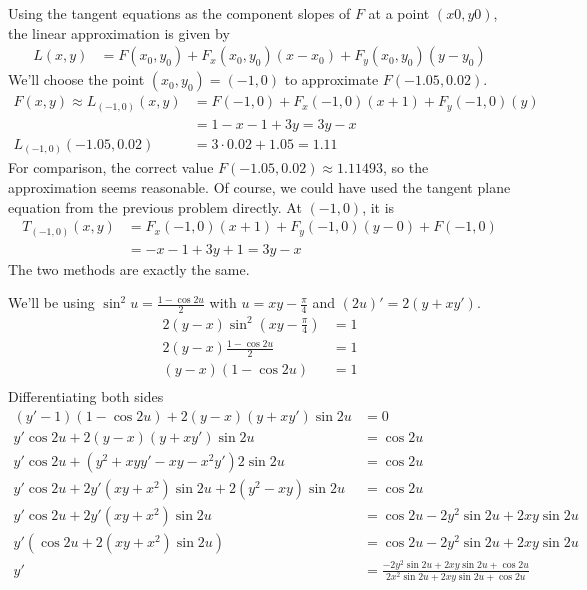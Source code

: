 \documentclass[a4paper,norsk,12pt]{article}
\begin{document}
Using the tangent equations as the component slopes of $F$ at a point $(x0,
y0)$, the linear approximation is given by
\begin{align*}
  L(x,y) &= F(x_0, y_0) + F_x(x_0, y_0)(x-x_0) + F_y(x_0, y_0)(y-y_0)
\end{align*}
We'll choose the point $(x_0, y_0) = (-1, 0)$ to approximate $F(-1.05, 0.02)$.
\begin{align*}
  F(x,y) \approx
  L_{(-1,0)}(x,y)
    &= F(-1,0) + F_x(-1,0)(x+1) + F_y(-1,0)(y) \\
    &= 1 - x - 1 + 3y = 3y-x \\
  L_{(-1,0)}(-1.05, 0.02)
    &= 3\cdot0.02 + 1.05 = 1.11
\end{align*}
For comparison, the correct value $F(-1.05, 0.02) \approx 1.11493$, so the
approximation seems reasonable. Of course, we could have used the tangent plane
equation from the previous problem directly. At $(-1,0)$, it is
\begin{align*}
  T_{(-1,0)}(x,y)
    &= F_x(-1,0)(x+1) + F_y(-1,0)(y-0) + F(-1,0)\\
    &= -x-1 + 3y + 1 = 3y-x
\end{align*}
The two methods are exactly the same.

We'll be using $\sin^2{u} = \frac{1-\cos{2u}}{2}$ with $u=xy-\frac{\pi}{4}$ and
$(2u)' = 2(y+xy')$.
\begin{align*}
  2(y-x)\sin^2{(xy-\frac{\pi}{4})} &= 1 \\
  2(y-x)\frac{1-\cos{2u}}{2} &= 1 \\
  (y-x)(1-\cos{2u}) &= 1 \\
\end{align*}
Differentiating both sides
\begin{align*}
  (y'-1)(1-\cos{2u}) + 2(y-x)(y+xy')\sin{2u} &= 0 \\
  y'\cos{2u} + 2(y-x)(y+xy')\sin{2u} &= \cos{2u} \\
  y'\cos{2u} + (y^2+xyy'-xy-x^2y')2\sin{2u} &= \cos{2u} \\
  y'\cos{2u} + 2y'(xy+x^2)\sin{2u}+2(y^2-xy)\sin{2u} &= \cos{2u} \\
  y'\cos{2u} + 2y'(xy+x^2)\sin{2u} &= \cos{2u}-2y^2\sin{2u}+2xy\sin{2u} \\
  y'(\cos{2u} + 2(xy+x^2)\sin{2u}) &= \cos{2u}-2y^2\sin{2u}+2xy\sin{2u} \\
  y' &= \frac{ -2y^2\sin{2u} + 2xy\sin{2u} + \cos{2u} }
             {  2x^2\sin{2u} + 2xy\sin{2u} + \cos{2u} } \\
\end{align*}
\end{document}
